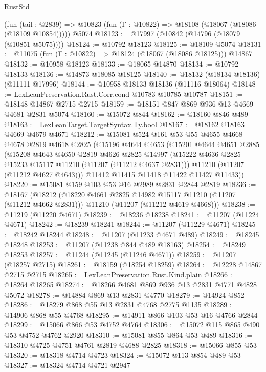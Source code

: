 \begin{lexlean}{RustStd}
\begin{coremodule}
    (fun (tail : @2839) => @10823 (fun (Γ : @10822) => @18108 (@18067 (@18086 (@18109 @10854)))))
    @5074
@18123 := @17997 (@10842 (@14796 (@18079 (@10851 @5075))))
@18124 := @10792 @18123
@18125 := @18109 @5074
@18131 := @11075 (fun (Γ : @10822) => @18124 (@18067 (@18086 @18125))) @14867
@18132 := @10958 @18123
@18133 := @18065 @14870
@18134 := @10792 @18133
@18136 := @14873 @18085 @18125
@18140 := @18132 (@18134 @18136) (@11111 @17996)
@18144 := @10958 @18133 @18136 (@11116 @18064)
@18148 := LexLeanPreservation.Rust.Corr.cond @10783 @10785 @10787
@18151 := @18148 @14867 @2715 @2715
@18159 := @18151 @847 @869 @936 @13 @4669 @4681 @2831 @5074
@18160 := @15072 @844
@18162 := @18160 @846 @489
@18163 := LexLeanTarget.TargetSyntax.Ty.bool
@18167 := @18162 @18163 @4669 @4679 @4671
@18212 := @15081
    @524
    @161
    @53
    @55
    @4655
    @4668
    @4678
    @2819
    @4618
    @2825
    (@15196
      @4644
      @4653
      (@15201
        @4644
        @4651
        @2885
        (@15208
          @4643
          @4650
          @2819
          @4626
          @2825
          @14997
          (@15222 @4636 @2825 @15233 @15117 @11210 (@11207 (@11212 @4637 @2831)))
          @11210
          (@11207 (@11212 @4627 @4643)))
        @11412
        @11415
        @11418
        @11422
        @11427
        @11433))
@18220 := @15081 @159 @103 @53 @16 @2989 @2831 @2844 @2819
@18236 := @18167
    (@18212
      (@18220 @4661 @2825 @14982 @15117 @11210 (@11207 (@11212 @4662 @2831)))
      @11210
      (@11207 (@11212 @4619 @4668)))
@18238 := @11219 (@11220 @4671)
@18239 := @18236 @18238
@18241 := @11207 (@11224 @4671)
@18242 := @18239 @18241
@18244 := @11207 (@11229 @4671)
@18245 := @18242 @18244
@18248 := @11207 (@11233 @4671 @489)
@18249 := @18245 @18248
@18253 := @11207 (@11238 @844 @489 @18163)
@18254 := @18249 @18253
@18257 := @11244 (@11245 (@11246 @4671))
@18259 := @11207 (@18257 @2715)
@18261 := @18159 (@18254 @18259)
@18264 := @12228 @14867 @2715 @2715
@18265 := LexLeanPreservation.Rust.Kind.plain
@18266 := @18264 @18265
@18274 := @18266 @4681 @869 @936 @13 @2831 @4771 @4828 @5072
@18278 := @14884 @869 @13 @2831 @4770
@18279 := @14924 @852
@18286 := @18279 @868 @55 @13 @2831 @4768 @2775 @1135
@18289 := @14906 @868 @55 @4768
@18295 := @14911 @866 @103 @53 @16 @4766 @2844
@18299 := @15066 @866 @53 @4752 @4764
@18306 := @15072 @115 @865 @490 @53 @4752 @4762 @2920
@18310 := @15081 @855 @864 @53 @489
@18316 := @18310 @4725 @4751 @4761 @2819 @4688 @2825
@18318 := @15066 @855 @53
@18320 := @18318 @4714 @4723
@18324 := @15072 @113 @854 @489 @53
@18327 := @18324 @4714 @4721 @2947

\end{coremodule}
\end{lexlean}
